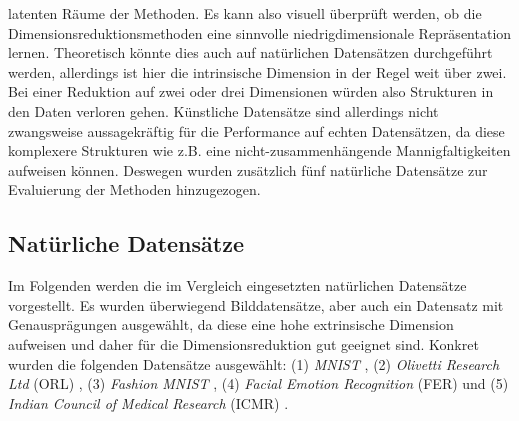 latenten Räume der Methoden. Es kann also visuell überprüft werden, ob die Dimensionsreduktionsmethoden eine sinnvolle niedrigdimensionale Repräsentation lernen. Theoretisch könnte dies auch auf natürlichen Datensätzen durchgeführt werden, allerdings ist hier die intrinsische Dimension in der Regel weit über zwei. Bei einer Reduktion auf zwei oder drei Dimensionen würden also Strukturen in den Daten verloren gehen. Künstliche Datensätze sind allerdings nicht zwangsweise aussagekräftig für die Performance auf echten Datensätzen, da diese komplexere Strukturen wie z.B. eine nicht-zusammenhängende Mannigfaltigkeiten aufweisen können. Deswegen wurden zusätzlich fünf natürliche Datensätze zur Evaluierung der Methoden hinzugezogen.

\subsection{Natürliche Datensätze}
\label{ch:Vergleich:sec:VerwendeteDatensaetze:natuerlich}
Im Folgenden werden die im Vergleich eingesetzten natürlichen Datensätze vorgestellt. Es wurden überwiegend Bilddatensätze, aber auch ein Datensatz mit Genausprägungen ausgewählt, da diese eine
hohe extrinsische Dimension aufweisen und daher für die Dimensionsreduktion gut geeignet sind.
Konkret wurden die folgenden Datensätze ausgewählt: (1) \textit{MNIST} \parencite{LeCun.2010}, (2) \textit{Olivetti Research Ltd} (ORL)
\parencite{Samaria.1994}, (3) \textit{Fashion MNIST} \parencite{Xiao.2017}, (4) \textit{Facial Emotion Recognition} (FER) \parencite{DumitruIanGoodfellowWillCukierskiYoshuaBengio.2013} und (5) \textit{Indian Council of
	Medical Research} (ICMR) \parencite{Mohapatra.2022}.

